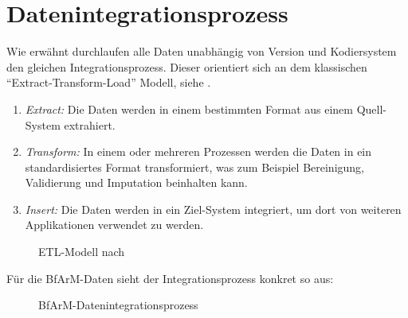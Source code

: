 \section{Datenintegrationsprozess}

Wie erwähnt durchlaufen alle Daten unabhängig von Version und Kodiersystem den gleichen Integrationsprozess. Dieser orientiert sich an dem klassischen "`Extract-Transform-Load"' Modell, siehe \citep[Seite 247ff]{bonnefoy2024definitive}.

\begin{enumerate}
\item \emph{Extract:} Die Daten werden in einem bestimmten Format aus einem Quell-System extrahiert. 
\item \emph{Transform:} In einem oder mehreren Prozessen werden die Daten in ein standardisiertes Format transformiert, was zum Beispiel Bereinigung, Validierung und Imputation beinhalten kann.
\item \emph{Insert:} Die Daten werden in ein Ziel-System integriert, um dort von weiteren Applikationen verwendet zu werden. 
\end{enumerate}


\begin{figure}[H]
    \centering
    \setlength{\fboxsep}{.02\linewidth}\color{black!20}
    \vspace{-10pt}
    \normalcolor\caption{ETL-Modell nach \citep[Seite 63]{bonnefoy2024definitive}}
\end{figure}

\newpage %

Für die BfArM-Daten sieht der Integrationsprozess konkret so aus:

\begin{figure}[H]
    \centering
    \resizebox{.9\textwidth}{!}{}
    \caption{BfArM-Datenintegrationsprozess}
\end{figure}

